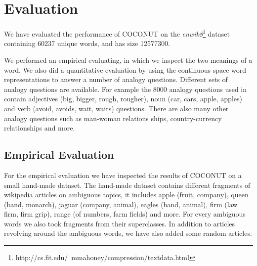 \documentclass[11pt]{article}
\begin{document}
\section{Evaluation}
We have evaluated the performance of COCONUT on the \textit{enwik8}\footnote{http://cs.fit.edu/~mmahoney/compression/textdata.html} dataset containing 60237 unique words, and has size 12577300. 

We performed an empirical evaluating, in which we inspect the two meanings of a word. We also did a quantitative evaluation by using the continuous space word representations to answer a number of analogy questions. Different sets of analogy questions are available. For example the 8000 analogy questions used in \cite{Mikolov:13} contain adjectives (big, bigger, rough, rougher), noun (car, cars, apple, apples) and verb (avoid, avoids, wait, waits) questions. There are also many other analogy questions such as man-woman relations ships, country-currency relationships and more.
\subsection{Empirical Evaluation}
For the empirical evaluation we have inspected the results of COCONUT on a small hand-made dataset. The hand-made dataset contains different fragments of wikipedia articles on ambiguous topics, it includes apple (fruit, company), queen (band, monarch), jaguar (company, animal), eagles (band, animal), firm (law firm, firm grip), range (of numbers, farm fields) and more. For every ambiguous words we also took fragments from their superclasses. In addition to articles revolving around the ambiguous words, we have also added some random articles.
\end{document}
